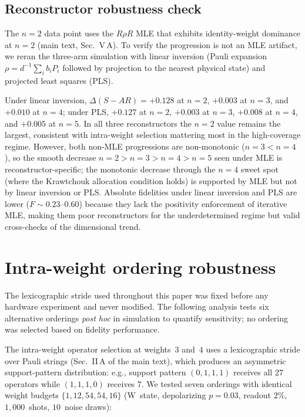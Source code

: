 \documentclass[twocolumn,prx,aps,superscriptaddress,longbibliography]{revtex4-2}
\begin{document}
\subsection{Reconstructor robustness check}

The $n = 2$ data point uses the $R\rho R$ MLE that exhibits
identity-weight dominance at $n = 2$ (main text, Sec.~V\,A).
To verify the progression is not an MLE artifact, we reran the
three-arm simulation with linear inversion (Pauli expansion
$\rho = d^{-1}\sum_i b_i P_i$ followed by projection to the nearest
physical state) and projected least squares (PLS).

Under linear inversion,
$\Delta(S{-}AR) = +0.128$ at $n = 2$, $+0.003$ at $n = 3$, and
$+0.010$ at $n = 4$; under PLS,
$+0.127$ at $n = 2$, $+0.003$ at $n = 3$, $+0.008$ at $n = 4$, and
$+0.005$ at $n = 5$.
In all three reconstructors the $n = 2$ value remains the largest,
consistent with intra-weight selection mattering most in the
high-coverage regime.  However, both non-MLE progressions are
non-monotonic ($n{=}3 < n{=}4$), so the smooth decrease
$n = 2 > n = 3 > n = 4 > n = 5$ seen under MLE is
reconstructor-specific; the monotonic decrease through the $n = 4$
sweet spot (where the Krawtchouk allocation condition holds) is
supported by MLE but not by linear inversion or PLS.  Absolute fidelities under linear inversion and PLS are lower
($F \sim 0.23$--$0.60$) because they lack the positivity enforcement
of iterative MLE, making them poor reconstructors for the
underdetermined regime but valid cross-checks of the dimensional trend.


\section{Intra-weight ordering robustness}
\label{sec:ordering}

The lexicographic stride used throughout this paper was fixed before
any hardware experiment and never modified.  The following analysis
tests six alternative orderings \emph{post hoc} in simulation to
quantify sensitivity; no ordering was selected based on fidelity
performance.

The intra-weight operator selection at weights~$3$ and~$4$ uses a
lexicographic stride over Pauli strings (Sec.~II\,A of the main text),
which produces an asymmetric support-pattern distribution: e.g.,
support pattern $(0,1,1,1)$ receives all $27$ operators while
$(1,1,1,0)$ receives $7$.  We tested seven orderings with identical
weight budgets $\{1, 12, 54, 54, 16\}$ (W~state, depolarizing
$p = 0.03$, readout $2$\%, $1{,}000$~shots, $10$~noise draws):
\end{document}

